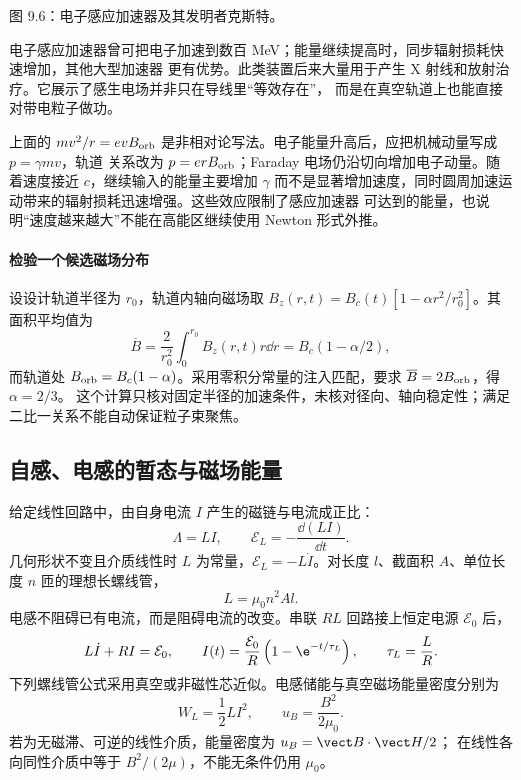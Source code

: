 {图 9.6：电子感应加速器及其发明者克斯特。}

电子感应加速器曾可把电子加速到数百 MeV；能量继续提高时，同步辐射损耗快速增加，其他大型加速器
更有优势。此类装置后来大量用于产生 X 射线和放射治疗。它展示了感生电场并非只在导线里“等效存在”，
而是在真空轨道上也能直接对带电粒子做功。

上面的 $mv^2/r=evB_{\rm orb}$ 是非相对论写法。电子能量升高后，应把机械动量写成 $p=\gamma mv$，轨道
关系改为 $p=erB_{\rm orb}$；Faraday 电场仍沿切向增加电子动量。随着速度接近 $c$，继续输入的能量主要增加
$\gamma$ 而不是显著增加速度，同时圆周加速运动带来的辐射损耗迅速增强。这些效应限制了感应加速器
可达到的能量，也说明“速度越来越大”不能在高能区继续使用 Newton 形式外推。


\paragraph{检验一个候选磁场分布}
设设计轨道半径为 $r_0$，轨道内轴向磁场取
$B_z(r,t)=B_c(t)[1-\alpha r^2/r_0^2]$。其面积平均值为
\[
 \overline B=\frac2{r_0^2}\int_0^{r_0}B_z(r,t)r\dd r
 =B_c(1-\alpha/2),
\]
而轨道处 $B_{\rm orb}=B_c(1-\alpha)$。采用零积分常量的注入匹配，要求 $\overline B=2B_{\rm orb}$，得 $\alpha=2/3$。
这个计算只核对固定半径的加速条件，未核对径向、轴向稳定性；满足二比一关系不能自动保证粒子束聚焦。

\subsection{自感、电感的暂态与磁场能量}

给定线性回路中，由自身电流 $I$ 产生的磁链与电流成正比：
\begin{equation}
  \boxed{\Lambda=LI},
  \qquad
  \boxed{\mathcal E_L=-\frac{\dd(LI)}{\dd t}}.
\end{equation}
几何形状不变且介质线性时 $L$ 为常量，$\mathcal E_L=-L\dot I$。对长度 $l$、截面积 $A$、单位长度
$n$ 匝的理想长螺线管，
\begin{equation}
  \boxed{L=\mu_0n^2Al}.
\end{equation}
电感不阻碍已有电流，而是阻碍电流的改变。串联 $RL$ 回路接上恒定电源 $\mathcal E_0$ 后，
\begin{equation}
  L\dot I+RI=\mathcal E_0,
  \qquad
  I(t)=\frac{\mathcal E_0}{R}\left(1-\e^{-t/\tau_L}\right),
  \qquad \tau_L=\frac LR.
\end{equation}
下列螺线管公式采用真空或非磁性芯近似。电感储能与真空磁场能量密度分别为
\begin{equation}
  \boxed{W_L=\frac12LI^2},
  \qquad
  \boxed{u_B=\frac{B^2}{2\mu_0}}.
\end{equation}
若为无磁滞、可逆的线性介质，能量密度为 $u_B=\vect B\cdot\vect H/2$；
在线性各向同性介质中等于 $B^2/(2\mu)$，不能无条件仍用 $\mu_0$。

